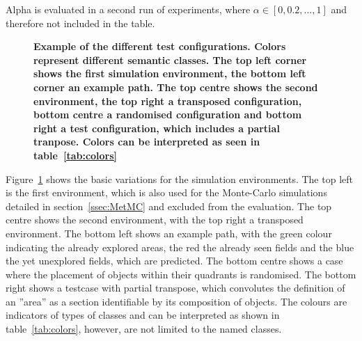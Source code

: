 \documentclass[twocolumn,letterpaper]{IEEEAerospaceCLS}  %
\begin{document}
Alpha is evaluated in a second run of experiments, where $\alpha \in [0, 0.2, ..., 1]$ and therefore not included in the table. 
\begin{figure}
    \centering
    \caption{\bf{
        Example of the different test configurations. Colors represent different semantic classes. The top left corner shows the first simulation environment, the bottom left corner an example path. The top centre shows the second environment, the top right a transposed configuration, bottom centre a randomised configuration and bottom right a test configuration, which includes a partial tranpose. Colors can be interpreted as seen in table~\ref{tab:colors}
    }}
    \label{fig:SimCase}
\end{figure}
Figure~\ref{fig:SimCase} shows the basic variations for the simulation environments. The top left is the first environment, which is also used for the Monte-Carlo simulations detailed in section~\ref{ssec:MetMC} and excluded from the evaluation. The top centre shows the second environment, with the top right a transposed environment. The bottom left shows an example path, with the green colour indicating the already explored areas, the red the already seen fields and the blue the yet unexplored fields, which are predicted. The bottom centre shows a case where the placement of objects within their quadrants is randomised. The bottom right shows a testcase with partial transpose, which convolutes the definition of an ''area'' as a section identifiable by its composition of objects. The colours are indicators of types of classes and can be interpreted as shown in table~\ref{tab:colors}, however, are not limited to the named classes.
\end{document}
